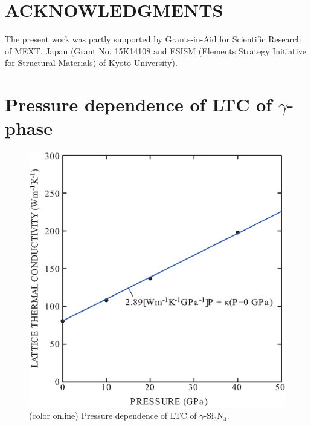 \documentclass[twocolumn,amsmath,amssymb,a4paper,prb,superscriptaddress,floatfix]{revtex4-1}
\begin{document}
\section*{ACKNOWLEDGMENTS}
The present work was partly supported by Grants-in-Aid for Scientific
Research of MEXT, Japan (Grant No. 15K14108 and ESISM (Elements Strategy
Initiative for Structural Materials) of Kyoto University).

\appendix
\section{Pressure dependence of LTC of $\gamma$-phase}
\begin{figure}[ht]
 \begin{center}
  \includegraphics[width=0.80\linewidth]{S1.eps} \caption{(color online)
  Pressure dependence of LTC of $\gamma$-Si$_3$N$_4$.  \label{fig:S1} }
 \end{center}
\end{figure}



\end{document}
